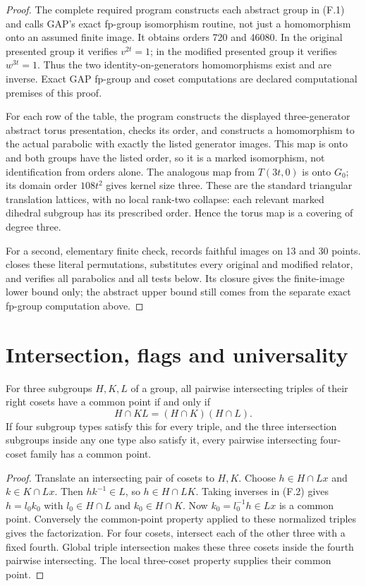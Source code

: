 \begin{proof}
The complete required program  constructs each
abstract group in (F.1) and calls GAP's exact fp-group isomorphism
routine, not just a homomorphism onto an assumed finite image. It
obtains orders 720 and 46080. In the original presented group it
verifies $v^{2t}=1$; in the modified presented group it verifies
$w^{3t}=1$. Thus the two identity-on-generators homomorphisms exist
and are inverse. Exact GAP fp-group and coset computations are
declared computational premises of this proof.

For each row of the table, the program constructs the displayed
three-generator abstract torus presentation, checks its order, and
constructs a homomorphism to the actual parabolic with exactly the
listed generator images. This map is onto and both groups have the
listed order, so it is a marked isomorphism, not identification from
orders alone. The analogous map from $T(3t,0)$ is onto $G_0$;
its domain order $108t^2$ gives kernel size three. These are the
standard triangular translation lattices, with no local rank-two
collapse: each relevant marked dihedral subgroup has its prescribed
order. Hence the torus map is a covering of degree three.

For a second, elementary finite check,  records
faithful images on 13 and 30 points.  closes
these literal permutations, substitutes every original and modified
relator, and verifies all parabolics and all tests below. Its closure
gives the finite-image lower bound only; the abstract upper bound
still comes from the separate exact fp-group computation above.
\end{proof}

\section{Intersection, flags and universality}
\begin{lemma}\label{lem:helly}
For three subgroups $H,K,L$ of a group, all pairwise intersecting
triples of their right cosets have a common point if and only if
\[
 H\cap KL=(H\cap K)(H\cap L).                          \tag{F.2}
\]
If four subgroup types satisfy this for every triple, and the three
intersection subgroups inside any one type also satisfy it, every
pairwise intersecting four-coset family has a common point.
\end{lemma}
\begin{proof}
Translate an intersecting pair of cosets to $H,K$. Choose
$h\in H\cap Lx$ and $k\in K\cap Lx$. Then $hk^{-1}\in L$, so
$h\in H\cap LK$. Taking inverses in (F.2) gives
$h=l_0k_0$ with $l_0\in H\cap L$ and $k_0\in H\cap K$.
Now $k_0=l_0^{-1}h\in Lx$ is a common point.
Conversely the common-point property applied to these
normalized triples gives the factorization. For four cosets, intersect
each of the other three with a fixed fourth. Global triple intersection
makes these three cosets inside the fourth pairwise intersecting.
The local three-coset property supplies their common point.
\end{proof}

